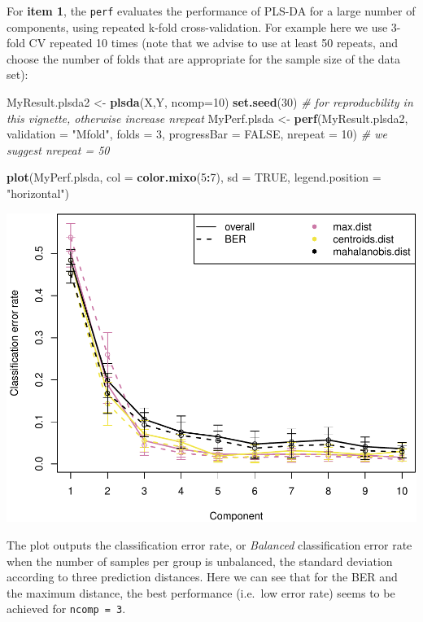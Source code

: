 \documentclass[]{book}
\newenvironment{Shaded}{\begin{snugshade}}{\end{snugshade}}
\newcommand{\CommentTok}[1]{\textcolor[rgb]{0.56,0.35,0.01}{\textit{#1}}}
\newcommand{\DataTypeTok}[1]{\textcolor[rgb]{0.13,0.29,0.53}{#1}}
\newcommand{\DecValTok}[1]{\textcolor[rgb]{0.00,0.00,0.81}{#1}}
\newcommand{\KeywordTok}[1]{\textcolor[rgb]{0.13,0.29,0.53}{\textbf{#1}}}
\newcommand{\NormalTok}[1]{#1}
\newcommand{\OperatorTok}[1]{\textcolor[rgb]{0.81,0.36,0.00}{\textbf{#1}}}
\newcommand{\OtherTok}[1]{\textcolor[rgb]{0.56,0.35,0.01}{#1}}
\newcommand{\StringTok}[1]{\textcolor[rgb]{0.31,0.60,0.02}{#1}}
\begin{document}
For \textbf{item 1}, the \texttt{perf} evaluates the performance of PLS-DA for a large number of components, using repeated k-fold cross-validation. For example here we use 3-fold CV repeated 10 times (note that we advise to use at least 50 repeats, and choose the number of folds that are appropriate for the sample size of the data set):

\begin{Shaded}
\begin{Highlighting}[]
\NormalTok{MyResult.plsda2 <-}\StringTok{ }\KeywordTok{plsda}\NormalTok{(X,Y, }\DataTypeTok{ncomp=}\DecValTok{10}\NormalTok{)}
\KeywordTok{set.seed}\NormalTok{(}\DecValTok{30}\NormalTok{) }\CommentTok{# for reproducbility in this vignette, otherwise increase nrepeat}
\NormalTok{MyPerf.plsda <-}\StringTok{ }\KeywordTok{perf}\NormalTok{(MyResult.plsda2, }\DataTypeTok{validation =} \StringTok{"Mfold"}\NormalTok{, }\DataTypeTok{folds =} \DecValTok{3}\NormalTok{, }
                  \DataTypeTok{progressBar =} \OtherTok{FALSE}\NormalTok{, }\DataTypeTok{nrepeat =} \DecValTok{10}\NormalTok{) }\CommentTok{# we suggest nrepeat = 50}

\KeywordTok{plot}\NormalTok{(MyPerf.plsda, }\DataTypeTok{col =} \KeywordTok{color.mixo}\NormalTok{(}\DecValTok{5}\OperatorTok{:}\DecValTok{7}\NormalTok{), }\DataTypeTok{sd =} \OtherTok{TRUE}\NormalTok{, }\DataTypeTok{legend.position =} \StringTok{"horizontal"}\NormalTok{)}
\end{Highlighting}
\end{Shaded}

\begin{center}\includegraphics[width=0.5\linewidth]{Figures/04-plsda-perf-1-1} \end{center}

The plot outputs the classification error rate, or \emph{Balanced} classification error rate when the number of samples per group is unbalanced, the standard deviation according to three prediction distances. Here we can see that for the BER and the maximum distance, the best performance (i.e.~low error rate) seems to be achieved for \texttt{ncomp\ =\ 3}.
\end{document}
